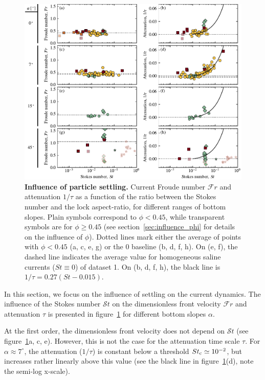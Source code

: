 \documentclass[12pt]{article}
\begin{document}
\begin{figure}[ht]
	\centering
	\includegraphics{figure5.pdf}
	\caption{\textbf{Influence of particle settling.} Current Froude number $\mathcal{F}r$ and attenuation $1/\tau$ as a function of the ratio between the Stokes number and the lock aspect-ratio, for different ranges of bottom slopes. Plain symbols correspond to $\phi < 0.45$, while transparent symbols are for $\phi \geq 0.45$ (see section~\ref{sec:influence_phi} for details on the influence of $\phi$). Dotted lines mark either the average of points with $\phi < 0.45$ (a, c, e, g) or the 0 baseline (b, d, f, h). On (e, f), the dashed line indicates the average value for homogeneous saline currents ($St \equiv 0$) of dataset 1. On (b, d, f, h), the black line is $1/\tau = 0.27 (St - 0.015)$.}
	\label{fig:fig5}
\end{figure}

In this section, we focus on the influence of settling on the current dynamics. The influence of the Stokes number $\mathcal{S}t$ on the dimensionless front velocity $\mathcal{F}r$ and attenuation $\tau$ is presented in figure~\ref{fig:fig5} for different bottom slopes $\alpha$.

At the first order, the dimensionless front velocity does not depend on $\mathcal{S}t$ (see figure~\ref{fig:fig5}a, c, e). However, this is not the case for the attenuation time scale $\tau$. For $\alpha \approx 7^\circ$, the attenuation ($1/\tau$) is constant below a threshold $St_{\text c} \simeq 10^{-2}$, but increases rather linearly above this value (see the black line in figure~\ref{fig:fig5}(d), note the semi-log x-scale).
\end{document}
